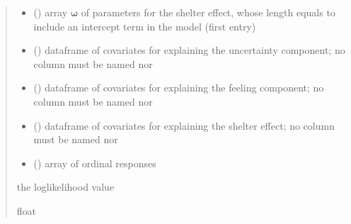 \documentclass[letterpaper,10pt,english]{sphinxmanual}
\begin{document}
\begin{fulllineitems}
\begin{quote}
\begin{description}
\begin{itemize}
\item {} 
\sphinxAtStartPar
{} () \textendash{} array \(\pmb \omega\) of parameters for the shelter effect, whose length equals 
 to include an intercept term in the model (first entry)

\item {} 
\sphinxAtStartPar
{} () \textendash{} dataframe of covariates for explaining the uncertainty component;
no column must be named  nor 

\item {} 
\sphinxAtStartPar
{} () \textendash{} dataframe of covariates for explaining the feeling component;
no column must be named  nor 

\item {} 
\sphinxAtStartPar
{} () \textendash{} dataframe of covariates for explaining the shelter effect;
no column must be named  nor 

\item {} 
\sphinxAtStartPar
{} () \textendash{} array of ordinal responses

\end{itemize}

\sphinxAtStartPar
the log\sphinxhyphen{}likelihood value

\sphinxAtStartPar
float

\end{description}\end{quote}

\end{fulllineitems}

\end{document}
